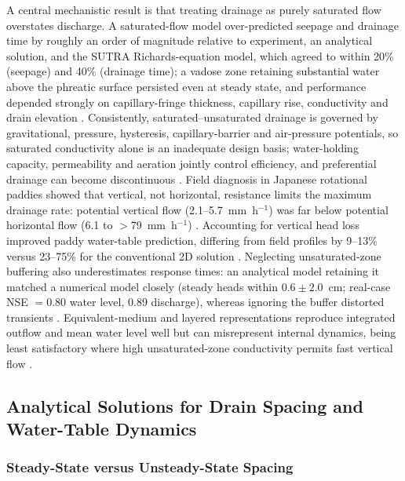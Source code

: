 \documentclass[11pt]{article}
\begin{document}
A central mechanistic result is that treating drainage as purely saturated flow overstates discharge. A saturated-flow model over-predicted seepage and drainage time by roughly an order of magnitude relative to experiment, an analytical solution, and the SUTRA Richards-equation model, which agreed to within 20\% (seepage) and 40\% (drainage time); a vadose zone retaining substantial water above the phreatic surface persisted even at steady state, and performance depended strongly on capillary-fringe thickness, capillary rise, conductivity and drain elevation \parencite{Xin2016b}. Consistently, saturated--unsaturated drainage is governed by gravitational, pressure, hysteresis, capillary-barrier and air-pressure potentials, so saturated conductivity alone is an inadequate design basis; water-holding capacity, permeability and aeration jointly control efficiency, and preferential drainage can become discontinuous \parencite{Li2021}. Field diagnosis in Japanese rotational paddies showed that vertical, not horizontal, resistance limits the maximum drainage rate: potential vertical flow (2.1--5.7~mm~h$^{-1}$) was far below potential horizontal flow (6.1 to $>$79~mm~h$^{-1}$) \parencite{Nishida2020}. Accounting for vertical head loss improved paddy water-table prediction, differing from field profiles by 9--13\% versus 23--75\% for the conventional 2D solution \parencite{Talukolaee2022}. Neglecting unsaturated-zone buffering also underestimates response times: an analytical model retaining it matched a numerical model closely (steady heads within $0.6\pm2.0$~cm; real-case NSE $=0.80$ water level, 0.89 discharge), whereas ignoring the buffer distorted transients \parencite{VandeCraats2021}. Equivalent-medium and layered representations reproduce integrated outflow and mean water level well but can misrepresent internal dynamics, being least satisfactory where high unsaturated-zone conductivity permits fast vertical flow \parencite{Carlier2007}.

\subsection{Analytical Solutions for Drain Spacing and Water-Table Dynamics}

\subsubsection{Steady-State versus Unsteady-State Spacing}
\end{document}
